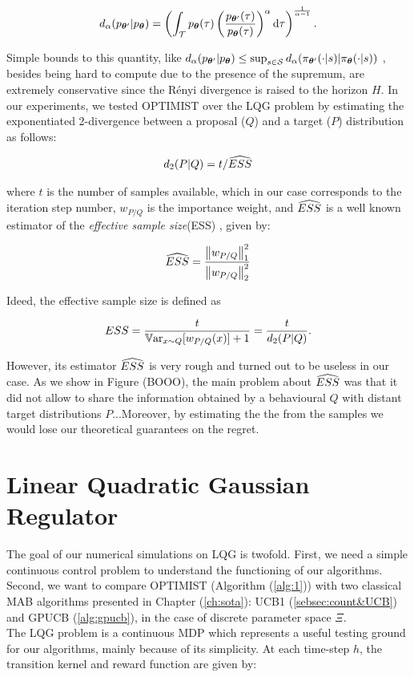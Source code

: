 \begin{align}
	d_{\alpha}(p_{\vtheta'}|p_{\vtheta}) = \left(\int_{\Tau}p_{\vtheta}(\tau)\left(\frac{p_{\vtheta'}(\tau)}{p_{\vtheta}(\tau)}\right)^{\alpha}\de \tau\right)^{\frac{1}{\alpha-1}}.
\end{align}

Simple bounds to this quantity, like $d_{\alpha}(p_{\vtheta'}|p_{\vtheta})\leq\sup_{s\in\Sspace}d_{\alpha}(\pi_{\vtheta'}(\cdot|s)|\pi_{\vtheta}(\cdot|s))$ , besides being hard to compute due to the presence of the supremum, are extremely conservative since the Rényi divergence is raised to the horizon $H$. In our experiments, we tested \gls{OPTIMIST} over the \gls{LQG} problem by estimating the exponentiated 2-\Renyi divergence between a proposal ($Q$) and a target ($P$) distribution as follows:

\begin{align}
d_{2}(P|Q)=t / \wh{ESS}
\end{align}

where $t$ is the number of samples available, which in our case corresponds to the iteration step number, $w_{P/Q}$ is the importance weight, and $\wh{ESS}$ \cite{martino2017effective} is a well known estimator of the \emph{effective sample size}(ESS) \cite{kong1992note}, given by:

\begin{align}
\wh{ESS} = \frac{\norm[1]{w_{P/Q}}^2}{\norm[2]{w_{P/Q}}^2}
\end{align}

Ideed, the effective sample size is defined as \cite{kong1992note}

\begin{align}
ESS = \frac{t}{\Var_{x\sim Q}[w_{P/Q}(x)]+1}=\frac{t}{d_{2}(P|Q)}.
\end{align}

However, its estimator $\wh{ESS}$ is very rough and turned out to be useless in our case. As we show in Figure (BOOO), the main problem about $\wh{ESS}$ was that  it did not allow to share the information obtained by a behavioural $Q$ with distant target distributions $P$...Moreover, by estimating the the \Renyi from the samples we would lose our theoretical guarantees on the regret.

\section{Linear Quadratic Gaussian Regulator}
The goal of our numerical simulations on \gls{LQG} is twofold. First, we need a simple continuous control problem to understand the functioning of our algorithms. Second, we want to compare \gls{OPTIMIST} (Algorithm (\ref{alg:1})) with two classical \gls{MAB} algorithms presented in Chapter (\ref{ch:sota}): \gls{UCB}1 (\ref{sebsec:count&UCB}) and \gls{GPUCB} (\ref{alg:gpucb}), in the case of discrete parameter space $\Xi$.\\
The \gls{LQG} problem \cite{peters2008reinforcement} is a continuous \gls{MDP} which represents a useful testing ground for our algorithms, mainly because of its simplicity. At each time-step $h$, the transition kernel and reward function are given by:

